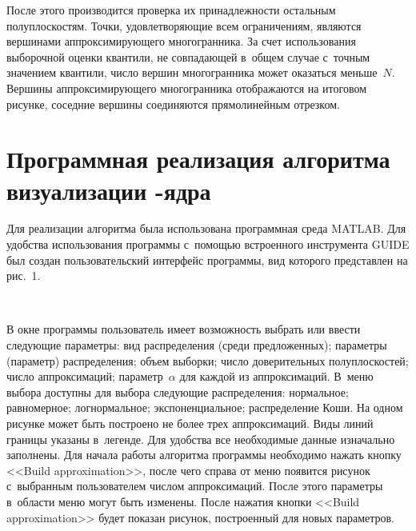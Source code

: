 \begin{multicols}{2}
\begin{enumerate}[1.]
\end{enumerate}

После этого производится проверка их принадлежности остальным по\-лу\-плос\-костям.
 Точки, удовле\-тво\-ря\-ющие всем ограничениям, яв\-ля\-ют\-ся
 вершинами аппроксимирующего многогранника.\linebreak
За счет использования выборочной оценки кван\-тили, не совпадающей в~общем 
случае с~точ\-ным значением квантили, чис\-ло
вершин многогранника может оказаться меньше~$N$.
Вершины аппроксимирующего многогранника отображаются на итоговом рисунке, 
со\-сед\-ние вершины соединяются прямолинейным отрезком.

\vspace*{-4pt}

\section{Программная реализация алгоритма визуализации {\boldmath{$\alpha$}}-ядра}

\vspace*{-2pt}

Для реализации алгоритма была использована программная среда MATLAB. 
Для удобства использования программы с~по\-мощью встро\-ен\-но\-го инструмента 
GUIDE был создан пользовательский интерфейс программы, вид которого 
пред\-став\-лен на рис.~1.

\begin{figure*} %
 \vspace*{1pt}
 \begin{center}
 \mbox{%
 \epsfxsize=163.202mm  
 }
 \end{center}
\vspace*{-11pt}
\vspace*{5pt}
\end{figure*}




В окне программы пользователь имеет воз\-мож\-ность выбрать или ввести 
сле\-ду\-ющие параметры: вид рас\-пре\-де\-ле\-ния (среди предложенных); 
па\-ра\-мет\-ры 
(па\-ра\-метр) распределения; объем выборки; чис\-ло доверительных полуплоскостей; 
чис\-ло аппроксимаций; па\-ра\-метр~$\alpha$ для каждой из аппроксимаций. 
В~меню выбора доступны для выбора сле\-ду\-ющие распределения: нормальное; равномерное; 
логнормальное; экспоненциальное; распределение Коши. На одном рисунке может 
быть по\-стро\-ено не более трех аппроксимаций. Виды линий границы указаны в~легенде.
Для удоб\-ст\-ва все необходимые данные изначально заполнены.
Для начала работы алгоритма программы необходимо нажать кнопку 
<<Build approximation>>,
после чего справа от меню появится рисунок с~выбранным пользователем 
чис\-лом аппроксимаций.
После этого па\-ра\-мет\-ры в~об\-ласти меню могут быть изменены.
После нажатия кноп\-ки 
<<Build approximation>> будет показан рисунок, по\-стро\-ен\-ный для новых па\-ра\-мет\-ров.


\end{multicols}
